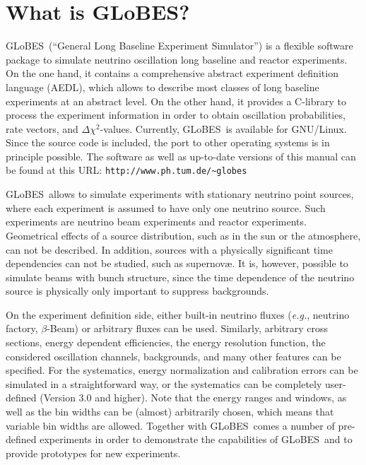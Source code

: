 \documentclass[a4paper,12pt,twoside]{book}
\newcommand{\eg}{{\it e.g.}}
\newcommand{\GLOBES}{{\sf GLoBES}}
\begin{document}
\cleardoublepage
\setcounter{page}{1}

\chapter*{What is \GLOBES ?}

\vspace*{-4ex}
\GLOBES\ (``General Long Baseline Experiment Simulator'') is a flexible
software package to simulate neutrino oscillation 
long baseline and reactor experiments. On the
one hand, it contains a comprehensive abstract experiment definition
language (AEDL), which allows to describe most classes 
of long baseline experiments
at an abstract level. On the other hand, it provides a C-library to
process the experiment information in order to obtain oscillation
probabilities, rate vectors, and $\Delta \chi^2$-values. Currently, 
\GLOBES\ is available for GNU/Linux. Since the source code is included,
the port to other operating systems is in principle possible. The software
as well as up-to-date versions of this manual can be found at this URL:
 \verb+http://www.ph.tum.de/~globes+

\GLOBES\ allows to simulate experiments with stationary neutrino point sources, where each experiment is assumed to have only one neutrino source.
Such experiments are neutrino beam experiments and reactor experiments. 
Geometrical effects of a source distribution, such as in the sun or the 
atmosphere, can not be described. In addition, sources with a physically 
significant time dependencies  can not be studied, such as  supernov\ae. It 
is, however, possible to simulate beams with bunch structure, since the 
time dependence of the neutrino source is physically only important to suppress backgrounds. 

On the experiment definition side, either built-in neutrino fluxes
(\eg, neutrino factory, $\beta$-Beam) or arbitrary fluxes can be used. Similarly,
arbitrary cross sections, energy dependent efficiencies, the
energy resolution function, the considered oscillation channels, 
backgrounds, and many other features can be specified. 
For the systematics, energy
normalization and calibration errors can be simulated in a straightforward way,
or the systematics can be completely user-defined (Version 3.0 and higher). Note that
the energy ranges and windows, as well as the bin widths can be
(almost) arbitrarily chosen, which means that variable bin
widths are allowed. Together with \GLOBES\ comes a number of
pre-defined experiments in order to demonstrate the capabilities
of \GLOBES\ and to provide prototypes for new experiments.
\end{document}
